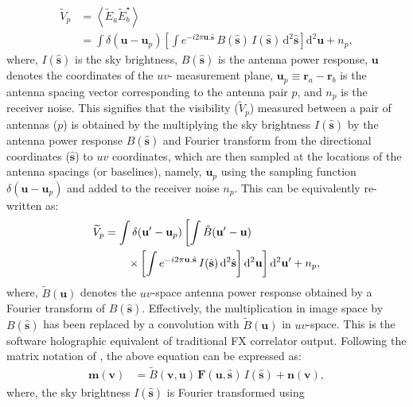 \documentclass[a4paper,fleqn,usenatbib]{../mnras}
\newcommand{\dif}{\mathrm{d}}
\begin{document}
\begin{align}
  \widetilde{V}_p &= \left\langle \widetilde{E}_a\widetilde{E}_b^\star \right\rangle \label{eqn:cc-vis}\\
                  &= \int\delta(\mathbf{u}-\mathbf{u}_p)\left[\int e^{-i2\pi\mathbf{u}.\hat{\mathbf{s}}}\,B(\hat{\mathbf{s}})\,I(\hat{\mathbf{s}})\,\dif^2\hat{\mathbf{s}}\right] \dif^2\mathbf{u} + n_p,
\end{align}
where, $I(\hat{\mathbf{s}})$ is the sky brightness, $B(\hat{\mathbf{s}})$ is the
antenna power response, $\mathbf{u}$ denotes the coordinates of the $uv$-
measurement plane, $\mathbf{u}_p\equiv \mathbf{r}_a-\mathbf{r}_b$ is the antenna
spacing vector corresponding to the antenna pair $p$, and $n_p$ is the receiver
noise. This signifies that the visibility ($\widetilde{V}_p$) measured between a
pair of antennas ($p$) is obtained by the multiplying the sky brightness
$I(\hat{\mathbf{s}})$ by the antenna power response $B(\hat{\mathbf{s}})$ and
Fourier transform from the directional coordinates ($\hat{\mathbf{s}}$) to $uv$
coordinates, which are then sampled at the locations of the antenna spacings (or
baselines), namely, $\mathbf{u}_p$ using the sampling function
$\delta(\mathbf{u}-\mathbf{u}_p)$ and added to the receiver noise $n_p$. This can
be equivalently re-written as:
\begin{align}\label{eqn:software-holography}
  \widetilde{V}_p &= \int\delta(\mathbf{u}^\prime-\mathbf{u}_p)\left[\int \tilde{B}(\mathbf{u}^\prime-\mathbf{u}) \right. \nonumber\\
  &\left. \qquad \times \left[\int e^{-i2\pi\mathbf{u}.\hat{\mathbf{s}}}\,I(\hat{\mathbf{s}})\,\dif^2\hat{\mathbf{s}}\right]\dif^2\mathbf{u}\vphantom{\int}\right] \dif^2\mathbf{u}^\prime + n_p,
\end{align}
where, $\tilde{B}(\mathbf{u})$ denotes the $uv$-space antenna power response
obtained by a Fourier transform of $B(\hat{\mathbf{s}})$. Effectively, the
multiplication in image space by $B(\hat{\mathbf{s}})$ has been replaced by a
convolution with $\tilde{B}(\mathbf{u})$ in $uv$-space. This is the software
holographic equivalent of traditional FX correlator output. Following the matrix
notation of \citet{mor11}, the above equation can be expressed as:
\begin{align}
  \mathbf{m}(\mathbf{v}) &= \widetilde{B}(\mathbf{v},\mathbf{u})\,\mathbf{F}(\mathbf{u},\hat{\mathbf{s}})\,I(\hat{\mathbf{s}}) + \mathbf{n}(\mathbf{v}),
\end{align}
where, the sky brightness $I(\hat{\mathbf{s}})$ is Fourier transformed using
\end{document}

